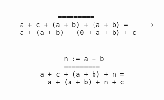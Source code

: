 \begin{landscape}
\begin{small}
\begin{multicols*}{3}[\begin{center}\section*{}\end{center}]
  \begin{tabular}{cc} 
  \begin{minipage}{0.22\textwidth}\begin{lstlisting}
  =========
  a + c + (a + b) + (a + b) = 
   a + (a + b) + (0 + a + b) + c
  \end{lstlisting}\end{minipage}
  & $\to$\\
  \begin{minipage}{0.22\textwidth}\begin{lstlisting}
      n := a + b
     =========
      a + c + (a + b) + n = 
       a + (a + b) + n + c
  \end{lstlisting}\end{minipage}
  \end{tabular}

\end{multicols*}

\end{small}
\end{landscape}
\restoregeometry
